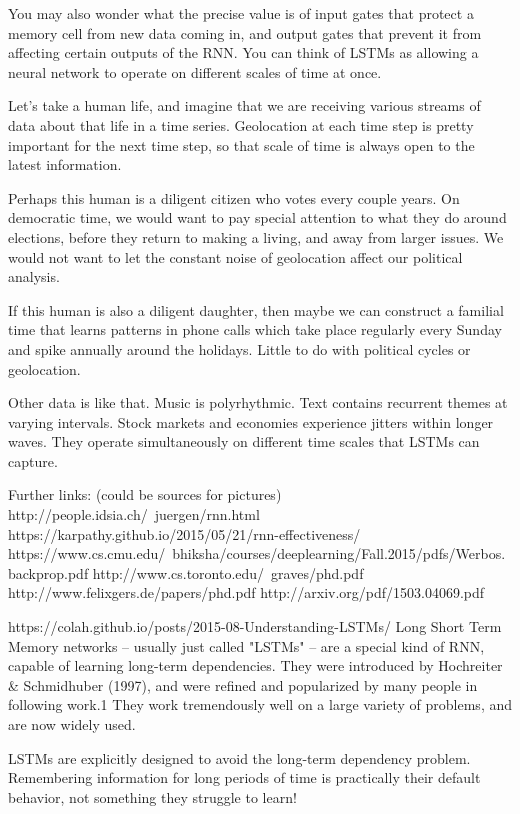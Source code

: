 {You may also wonder what the precise value is of input gates that protect a memory cell from new data coming in, and output gates that prevent it from affecting certain outputs of the RNN. You can think of LSTMs as allowing a neural network to operate on different scales of time at once.

Let’s take a human life, and imagine that we are receiving various streams of data about that life in a time series. Geolocation at each time step is pretty important for the next time step, so that scale of time is always open to the latest information.

Perhaps this human is a diligent citizen who votes every couple years. On democratic time, we would want to pay special attention to what they do around elections, before they return to making a living, and away from larger issues. We would not want to let the constant noise of geolocation affect our political analysis.

If this human is also a diligent daughter, then maybe we can construct a familial time that learns patterns in phone calls which take place regularly every Sunday and spike annually around the holidays. Little to do with political cycles or geolocation.

Other data is like that. Music is polyrhythmic. Text contains recurrent themes at varying intervals. Stock markets and economies experience jitters within longer waves. They operate simultaneously on different time scales that LSTMs can capture.

Further links: (could be sources for pictures)
http://people.idsia.ch/~juergen/rnn.html
https://karpathy.github.io/2015/05/21/rnn-effectiveness/
https://www.cs.cmu.edu/~bhiksha/courses/deeplearning/Fall.2015/pdfs/Werbos.backprop.pdf
http://www.cs.toronto.edu/~graves/phd.pdf
http://www.felixgers.de/papers/phd.pdf
http://arxiv.org/pdf/1503.04069.pdf


https://colah.github.io/posts/2015-08-Understanding-LSTMs/
Long Short Term Memory networks – usually just called "LSTMs" – are a special kind of RNN, capable of learning long-term dependencies. They were introduced by Hochreiter \& Schmidhuber (1997), and were refined and popularized by many people in following work.1 They work tremendously well on a large variety of problems, and are now widely used.

LSTMs are explicitly designed to avoid the long-term dependency problem. Remembering information for long periods of time is practically their default behavior, not something they struggle to learn!

}
